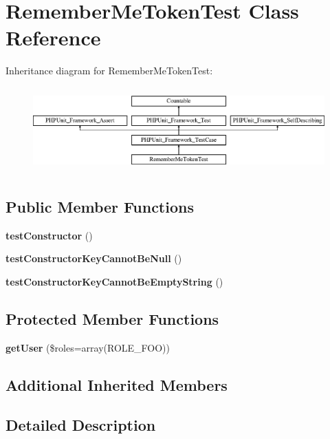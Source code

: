 \section{Remember\+Me\+Token\+Test Class Reference}
\label{class_symfony_1_1_component_1_1_security_1_1_core_1_1_tests_1_1_authentication_1_1_token_1_1_remember_me_token_test}
Inheritance diagram for Remember\+Me\+Token\+Test\+:\begin{figure}[H]
\begin{center}
\leavevmode
\includegraphics[height=3.303835cm]{class_symfony_1_1_component_1_1_security_1_1_core_1_1_tests_1_1_authentication_1_1_token_1_1_remember_me_token_test}
\end{center}
\end{figure}
\subsection*{Public Member Functions}
\begin{DoxyCompactItemize}
\item 
{\bf test\+Constructor} ()
\item 
{\bf test\+Constructor\+Key\+Cannot\+Be\+Null} ()
\item 
{\bf test\+Constructor\+Key\+Cannot\+Be\+Empty\+String} ()
\end{DoxyCompactItemize}
\subsection*{Protected Member Functions}
\begin{DoxyCompactItemize}
\item 
{\bf get\+User} (\$roles=array(\textquotesingle{}R\+O\+L\+E\+\_\+\+F\+O\+O\textquotesingle{}))
\end{DoxyCompactItemize}
\subsection*{Additional Inherited Members}


\subsection{Detailed Description}


